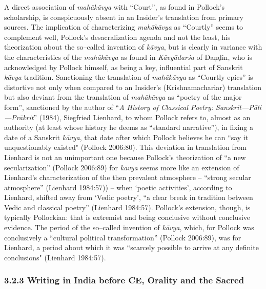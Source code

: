 A direct association of \textit{mahākāvya} with “Court”, as found in Pollock’s scholarship, is conspicuously absent in an Insider’s translation from primary sources. The implication of characterizing \textit{mahākāvya} as “Courtly” seems to complement well, Pollock’s desacralization agenda and not the least, his theorization about the so–called invention of \textit{kāvya}, but is clearly in variance with the characteristics of the \textit{mahākāvya} as found in \textit{Kāvyādarśa} of Daṇḍin, who is acknowledged by Pollock himself, as being a key, influential part of Sanskrit \textit{kāvya} tradition. Sanctioning the translation of \textit{mahākāvya} as “Courtly epics” is distortive not only when compared to an Insider’s (Krishnamachariar) translation but also deviant from the translation of \textit{mahākāvya} as “poetry of the major form”, sanctioned by the author of “\textit{A History of Classical Poetry: Sanskrit—Pāli—Prākrit}”\textit{} (1984), Siegfried Lienhard, to whom Pollock refers to, almost as an authority (at least whose history he deems as “standard narrative”), in fixing a date of a Sanskrit \textit{kāvya}, that date after which Pollock believes he can “say it unquestionably existed" (Pollock 2006:80). This deviation in translation from Lienhard is not an unimportant one because Pollock’s theorization of “a new secularization” (Pollock 2006:89) for \textit{kāvya} seems more like an extension of Lienhard’s characterization of the then prevalent atmosphere – “strong secular atmosphere” (Lienhard 1984:57)) – when ‘poetic activities’, according to Lienhard, shifted away from ‘Vedic poetry’, “a clear break in tradition between Vedic and classical poetry” (Lienhard 1984:57). Pollock’s extension, though, is typically Pollockian: that is extremist and being conclusive without conclusive evidence. The period of the so–called invention of \textit{kāvya}, which, for Pollock was conclusively a “cultural political transformation” (Pollock 2006:89), was for Lienhard, a period about which it was “scarcely possible to arrive at any definite conclusions" (Lienhard 1984:57).


\subsubsection*{3.2.3 Writing in India before CE, Orality and the Sacred}

\vskip -9.9pt

